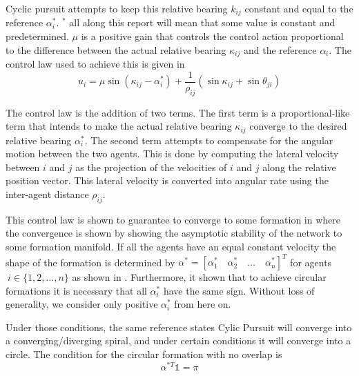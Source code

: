 Cyclic pursuit attempts to keep this relative bearing $k_{ij}$ constant and equal to the reference $\alpha_i^*$. $^*$ all along this report will mean that some value is constant and predetermined. $\mu$ is a positive gain that controls the control action proportional to the difference between the actual relative bearing $\kappa_{ij}$ and the reference $\alpha_i$. The control law used to achieve this is given in \cite{galloway2013symmetry}
\begin{equation}
  u_i = \mu  \sin(\kappa_{ij} -\alpha_i^*) + \frac{1}{\rho_{ij}} ( \sin \kappa_{ij} + \sin \theta_{ji})
\end{equation}

The control law is the addition of two terms. The first term is a proportional-like term that intends to make the actual relative bearing $\kappa_{ij}$ converge to the desired relative bearing $\alpha_i^*$. The second term attempts to compensate for the angular motion between the two agents. This is done by computing the lateral velocity between $i$ and $j$ as the projection of the velocities of $i$ and $j$ along the relative position vector. This lateral velocity is converted into angular rate using the inter-agent distance $\rho_{ij}$.

This control law is shown to guarantee to converge to some formation in \cite{galloway2013symmetry} where the convergence is shown by showing the asymptotic stability of the network to some formation manifold. 
If all the agents have an equal constant velocity the shape of the formation is determined by $\alpha^* = [\alpha_1^* \quad \alpha_2^* \quad \ldots \quad \alpha_n^*]^T$ for agents $\ i\in\{1,2, \ldots, n\}$ as shown in \cite{galloway2013symmetry}. Furthermore, it shown that to achieve circular formations it is necessary that all $\alpha_i^*$ have the same sign. Without loss of generality, we consider only positive $\alpha_i^*$ from here on. 

Under those conditions, the same reference states Cylic Pursuit will converge into a converging/diverging spiral, and under certain conditions it will converge into a circle. The condition for the circular formation with no overlap is
\begin{equation}
  \alpha^{*T} \mathbb{1} = \pi
\end{equation}

